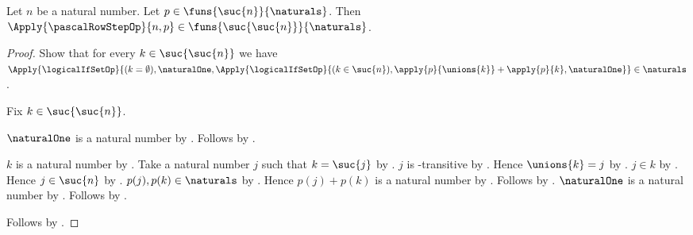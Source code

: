 \begin{lemma}\label{pascal_row_step_type}
    Let $n$ be a natural number.
    Let $p\in\funs{\suc{n}}{\naturals}$.
    Then $\Apply{\pascalRowStepOp}{n,p}
        \in\funs{\suc{\suc{n}}}{\naturals}$.
\end{lemma}
\begin{proof}
    Show that for every $k\in\suc{\suc{n}}$ we have
        $\Apply{\logicalIfSetOp}{
            (k=\emptyset),\naturalOne,
            \Apply{\logicalIfSetOp}{
                (k\in\suc{n}),
                \apply{p}{\unions{k}}+\apply{p}{k},
                \naturalOne}}\in\naturals$.
    \begin{subproof}
        Fix $k\in\suc{\suc{n}}$.
        \begin{byCase}
                $\naturalOne$ is a natural number by
                    .
                Follows by .
                \begin{byCase}
                        $k$ is a natural number by
                            .
                        Take a natural number $j$ such that $k=\suc{j}$
                            by .
                        $j$ is \in-transitive by
                            .
                        Hence $\unions{k}=j$ by
                            .
                        $j\in k$ by .
                        Hence $j\in\suc{n}$ by
                            .
                        $p(j),p(k)\in\naturals$ by
                            .
                        Hence $p(j)+p(k)$ is a natural number by
                            .
                        Follows by
                            .
                        $\naturalOne$ is a natural number by
                            .
                        Follows by
                            .
                \end{byCase}
        \end{byCase}
    \end{subproof}
    Follows by
        .
\end{proof}

